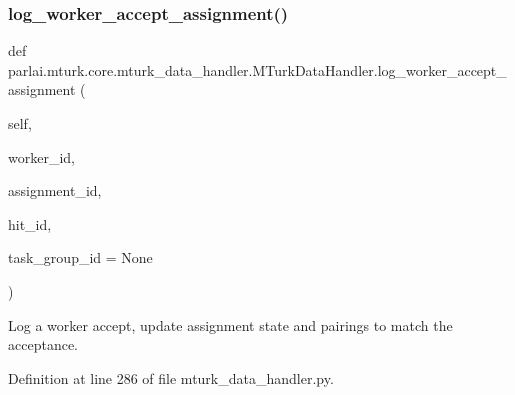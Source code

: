 \subsubsection{\texorpdfstring{log\+\_\+worker\+\_\+accept\+\_\+assignment()}{log\_worker\_accept\_assignment()}}
{\footnotesize\ttfamily def parlai.\+mturk.\+core.\+mturk\+\_\+data\+\_\+handler.\+M\+Turk\+Data\+Handler.\+log\+\_\+worker\+\_\+accept\+\_\+assignment (\begin{DoxyParamCaption}\item[{}]{self,  }\item[{}]{worker\+\_\+id,  }\item[{}]{assignment\+\_\+id,  }\item[{}]{hit\+\_\+id,  }\item[{}]{task\+\_\+group\+\_\+id = {\ttfamily None} }\end{DoxyParamCaption})}

\begin{DoxyVerb}Log a worker accept, update assignment state and pairings to match the
acceptance.
\end{DoxyVerb}
 

Definition at line 286 of file mturk\+\_\+data\+\_\+handler.\+py.


